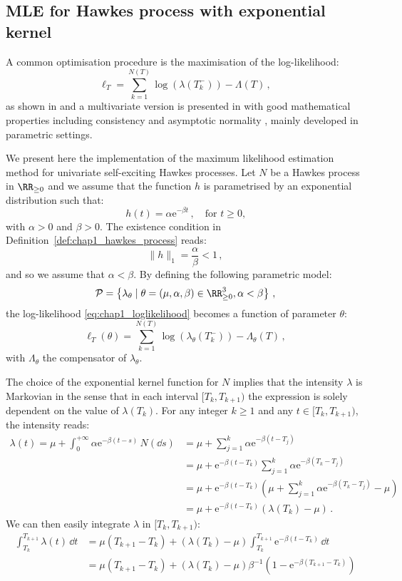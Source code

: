 \subsection{MLE for Hawkes process with exponential kernel}\label{sec:chap1_exponential_MLE}

A common optimisation procedure is the maximisation of the log-likelihood:
\[\ell_T = \sum_{k=1}^{N(T)}{\log(\lambda(T_k^-))} - \Lambda(T)\,,\]
as shown in \textcite{Ozaki1979} and a multivariate version is presented in \textcite{Embrechts2011, Guo2018} with good mathematical properties including consistency and asymptotic normality \parencite{Clinet2017}, mainly developed in parametric settings.

We present here the implementation of the maximum likelihood estimation method for univariate self-exciting Hawkes processes.
Let $N$ be a Hawkes process in $\RR_{\geq 0}$ and we assume that the function $h$ is parametrised by an exponential distribution such that:
\[h(t) = \alpha\mathrm{e}^{-\beta t}\,, \quad \text{for $t\geq 0$,}\]
with $\alpha >0$ and $\beta>0$.
The existence condition in Definition~\ref{def:chap1_hawkes_process} reads:
\[\|h\|_1 = \frac{\alpha}{\beta} < 1\,,\]
and so we assume that $\alpha < \beta$. 
By defining the following parametric model:
\[\mathcal{P} = \left\{
    \lambda_\theta \mid \theta = (\mu, \alpha, \beta)\in\RR_{\geq 0}^3, \alpha < \beta
\right\}\,,\]
the log-likelihood \eqref{eq:chap1_loglikelihood} becomes a function of parameter $\theta$:
\[
    \ell_T(\theta) = \sum_{k=1}^{N(T)}{\log(\lambda_\theta(T_k^-))} - \Lambda_\theta(T)\,,
\]
with $\Lambda_\theta$ the compensator of $\lambda_\theta$.

The choice of the exponential kernel function for $N$ implies that the intensity $\lambda$ is Markovian in the sense that in each interval $[T_k,T_{k+1})$ the expression is solely dependent on the value of $\lambda(T_k)$.
For any integer $k\geq 1$ and any $t\in[T_k,T_{k+1})$, the intensity reads:
\begin{align}
    \lambda(t) = \mu + \int_{0}^{+\infty}{\alpha \mathrm{e}^{-\beta(t-s)}\,N(\dd s)} &= \mu + \sum_{j=1}^{k}{\alpha \mathrm{e}^{-\beta(t-T_j)}}\nonumber\\
    &=\mu + \mathrm{e}^{-\beta(t - T_k)}\sum_{j=1}^{k}{\alpha \mathrm{e}^{-\beta(T_k-T_j)}}\nonumber\\
    &=\mu + \mathrm{e}^{-\beta(t - T_k)}\left(\mu + \sum_{j=1}^{k}{\alpha \mathrm{e}^{-\beta(T_k-T_j)}} - \mu\right)\nonumber\\
    &=\mu + \mathrm{e}^{-\beta(t - T_k)}\left(\lambda(T_k) - \mu\right)\label{eq:chap1_recursive_intensity}\,.
\end{align}
We can then easily integrate $\lambda$ in $[T_k,T_{k+1})$:
\begin{align*}
    \int_{T_k}^{T_{k+1}}{\lambda(t)\,\dd t} &= \mu(T_{k+1} - T_k) + (\lambda(T_k) - \mu) \int_{T_k}^{T_{k+1}}{\mathrm{e}^{-\beta(t - T_k)}\,\dd t}\\
    &= \mu(T_{k+1} - T_k) + (\lambda(T_k) - \mu)\beta^{-1}(1 - \mathrm{e}^{-\beta(T_{k+1} - T_k)})
\end{align*}

